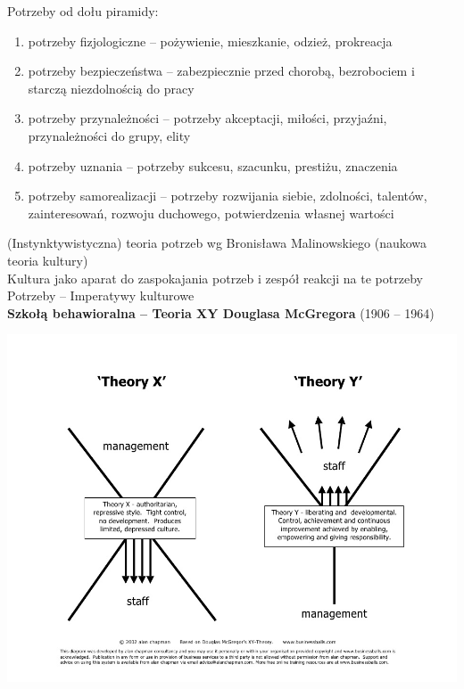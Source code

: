 \documentclass[a4paper,10pt]{report}
\begin{document}
Potrzeby od dołu piramidy:
\begin{enumerate}
	\item potrzeby fizjologiczne -- pożywienie, mieszkanie, odzież, prokreacja
	\item potrzeby bezpieczeństwa -- zabezpiecznie przed chorobą, bezrobociem i starczą niezdolnością do pracy
	\item potrzeby przynależności -- potrzeby akceptacji, miłości, przyjaźni, przynależności do grupy, elity 
	\item potrzeby uznania -- potrzeby sukcesu, szacunku, prestiżu, znaczenia
	\item potrzeby samorealizacji -- potrzeby rozwijania siebie, zdolności, talentów, zainteresowań, rozwoju duchowego, potwierdzenia własnej wartości
\end{enumerate}

(Instynktywistyczna) teoria potrzeb wg Bronisława Malinowskiego (naukowa teoria kultury)\\

Kultura jako aparat do zaspokajania potrzeb i zespół reakcji na te potrzeby\\
Potrzeby -- Imperatywy kulturowe
\\

\textbf{Szkołą behawioralna -- Teoria XY Douglasa McGregora} (1906 -- 1964)\\

\begin{center}
\includegraphics[scale=0.35]{assets/teoriaxy} \\
\end{center}
\end{document}

